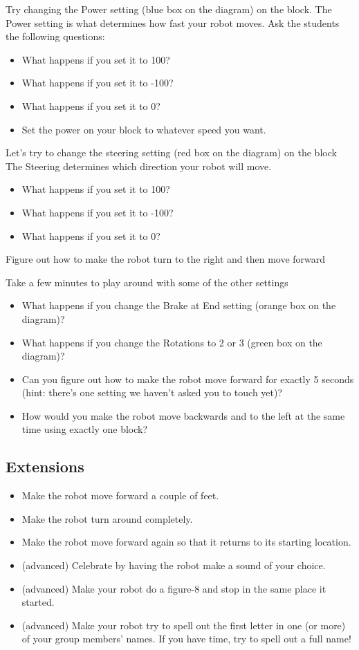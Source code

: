 \documentclass{lessonplan}
\begin{document}
    Try changing the Power setting (blue box on the diagram) on the block.
    The Power setting is what determines how fast your robot moves. Ask the students the following questions:
    \begin{itemize}
        \item What happens if you set it to 100?
        \item What happens if you set it to -100?
        \item What happens if you set it to 0?
        \item Set the power on your block to whatever speed you want.
    \end{itemize}
    \par
    Let’s try to change the steering setting (red box on the diagram) on the block
    The Steering determines which direction your robot will move.
    \begin{itemize}
        \item What happens if you set it to 100?
        \item What happens if you set it to -100?
        \item What happens if you set it to 0?
    \end{itemize}
    \par
    Figure out how to make the robot turn to the right and then move forward
    \par
    Take a few minutes to play around with some of the other settings
    \begin{itemize}
        \item What happens if you change the Brake at End setting (orange box on the diagram)?
        \item What happens if you change the Rotations to 2 or 3 (green box on the diagram)?
        \item Can you figure out how to make the robot move forward for exactly 5 seconds (hint: there’s one setting we haven’t asked you to touch yet)?
        \item  How would you make the robot move backwards and to the left at the same time using exactly one block?
    \end{itemize}

    \subsection{Extensions}
      \begin{itemize}
        \item Make the robot move forward a couple of feet.
        \item Make the robot turn around completely.
        \item Make the robot move forward again so that it returns to its starting location.
        \item (advanced) Celebrate by having the robot make a sound of your choice.
        \item (advanced) Make your robot do a figure-8 and stop in the same place it started.
        \item (advanced) Make your robot try to spell out the first letter in one (or more) of your group members’ names. If you have time, try to spell out a full name!
      \end{itemize}
\end{document}
